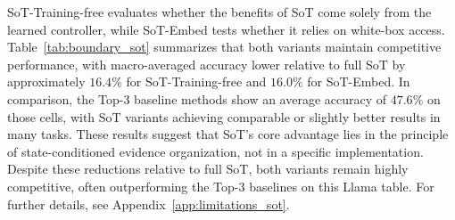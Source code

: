     SoT-Training-free evaluates whether the benefits of SoT come solely from the learned controller, while SoT-Embed tests whether it relies on white-box access. 
    Table~\ref{tab:boundary_sot} summarizes that both variants maintain competitive performance, with macro-averaged accuracy lower relative to full SoT by approximately \(16.4\%\) for SoT-Training-free and \(16.0\%\) for SoT-Embed. In comparison, the Top-3 baseline methods show an average accuracy of \(47.6\%\) on those cells, with SoT variants achieving comparable or slightly better results in many tasks. These results suggest that SoT's core advantage lies in the principle of state-conditioned evidence organization, not in a specific implementation. Despite these reductions relative to full SoT, both variants remain highly competitive, often outperforming the Top-3 baselines on this Llama table. For further details, see Appendix~\ref{app:limitations_sot}.

